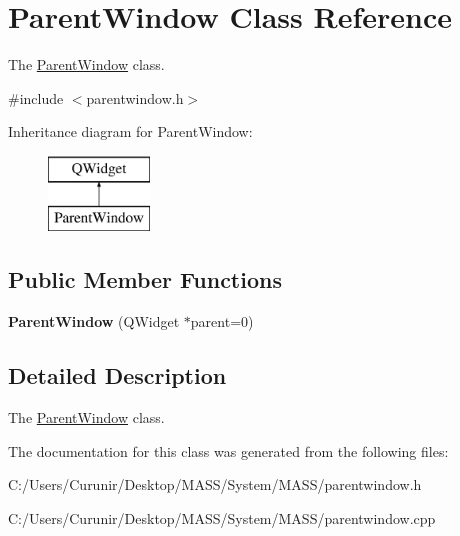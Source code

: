 \hypertarget{class_parent_window}{}\section{Parent\+Window Class Reference}
\label{class_parent_window}


The \hyperlink{class_parent_window}{Parent\+Window} class.  




{\ttfamily \#include $<$parentwindow.\+h$>$}

Inheritance diagram for Parent\+Window\+:\begin{figure}[H]
\begin{center}
\leavevmode
\includegraphics[height=2.000000cm]{class_parent_window}
\end{center}
\end{figure}
\subsection*{Public Member Functions}
\begin{DoxyCompactItemize}
\item 
\mbox{\label{class_parent_window_aa7a1b9030900a9042a59496d6d23c90f}} 
{\bfseries Parent\+Window} (Q\+Widget $\ast$parent=0)
\end{DoxyCompactItemize}


\subsection{Detailed Description}
The \hyperlink{class_parent_window}{Parent\+Window} class. 

The documentation for this class was generated from the following files\+:\begin{DoxyCompactItemize}
\item 
C\+:/\+Users/\+Curunir/\+Desktop/\+M\+A\+S\+S/\+System/\+M\+A\+S\+S/parentwindow.\+h\item 
C\+:/\+Users/\+Curunir/\+Desktop/\+M\+A\+S\+S/\+System/\+M\+A\+S\+S/parentwindow.\+cpp\end{DoxyCompactItemize}
